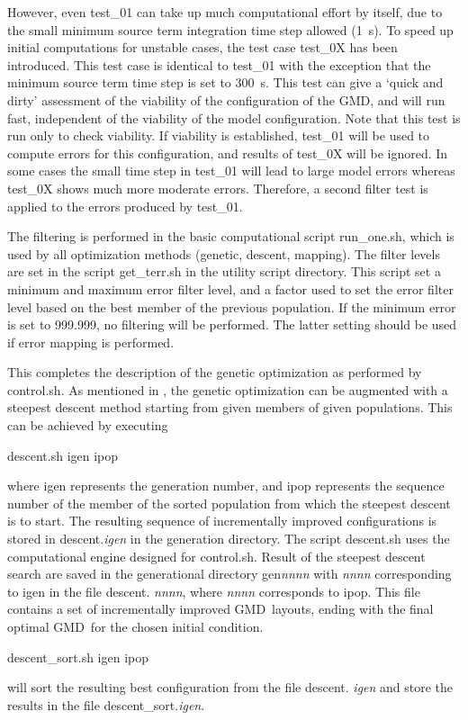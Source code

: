 \documentclass[12pt]{article}
\newcommand{\gmd}{GMD}
\newcommand{\file}{\sf}
\begin{document}
However, even {\file test\_01} can take up much computational effort by
itself, due to the small minimum source term integration time step allowed
(1~s). To speed up initial computations for unstable cases, the test case
{\file test\_0X} has been introduced. This test case is identical to {\file
test\_01} with the exception that the minimum source term time step is set to
300~s. This test can give a `quick and dirty' assessment of the viability of
the configuration of the GMD, and will run fast, independent of the viability
of the model configuration. Note that this test is run only to check
viability. If viability is established, {\file test\_01} will be used to
compute errors for this configuration, and results of {\file test\_0X} will be
ignored. In some cases the small time step in {\file test\_01} will lead to
large model errors whereas {\file test\_0X} shows much more moderate
errors. Therefore, a second filter test is applied to the errors produced by
{\file test\_01}.

The filtering is performed in the basic computational script {\file
run\_one.sh}, which is used by all optimization methods (genetic, descent,
mapping).  The filter levels are set in the script {\file get\_terr.sh} in the
utility script directory. This script set a minimum and maximum error filter
level, and a factor used to set the error filter level based on the best
member of the previous population. If the minimum error is set to 999.999, no
filtering will be performed. The latter setting should be used if error
mapping is performed.


\vspace{\baselineskip}
\noindent 
This completes the description of the genetic optimization as performed by
{\file control.sh}. As mentioned in \cite{tol:MMAB10d}, the genetic
optimization can be augmented with a steepest descent method starting from
given members of given populations. This can be achieved by executing
\begin{center}
{\file descent.sh igen ipop}
\end{center}
\noindent
where {\file igen} represents the generation number, and {\file ipop}
represents the sequence number of the member of the sorted population from
which the steepest descent is to start. The resulting sequence of
incrementally improved configurations is stored in {\file descent.{\it igen}}
in the generation directory.  The script {\file descent.sh} uses the
computational engine designed for {\file control.sh}. Result of the steepest
descent search are saved in the generational directory {\file gen{\it nnnn}}
with {\it nnnn} corresponding to {\file igen} in the file {\file descent.{\it
nnnn}}, where {\it nnnn} corresponds to {\file ipop}. This file contains a set
of incrementally improved \gmd\ layouts, ending with the final optimal \gmd\
for the chosen initial condition.
\begin{center}
{\file descent\_sort.sh igen ipop}
\end{center}
\noindent
will sort the resulting best configuration from the file {\file descent.{\it
igen}} and store the results in the file {\file descent\_sort.{\it igen}}.
\end{document}

